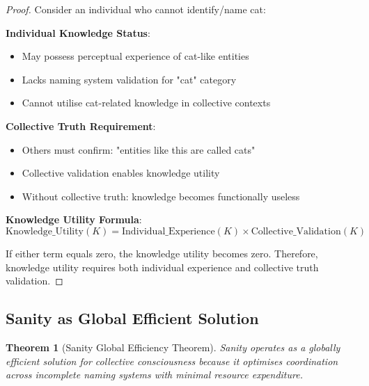 \documentclass[12pt,a4paper]{article}
\newtheorem{theorem}{Theorem}[section]
\begin{document}
\begin{proof}
Consider an individual who cannot identify/name cat:

\textbf{Individual Knowledge Status}:
\begin{itemize}
\item May possess perceptual experience of cat-like entities
\item Lacks naming system validation for "cat" category
\item Cannot utilise cat-related knowledge in collective contexts
\end{itemize}

\textbf{Collective Truth Requirement}:
\begin{itemize}
\item Others must confirm: "entities like this are called cats"
\item Collective validation enables knowledge utility
\item Without collective truth: knowledge becomes functionally useless
\end{itemize}

\textbf{Knowledge Utility Formula}:
\begin{equation}
\text{Knowledge\_Utility}(K) = \text{Individual\_Experience}(K) \times \text{Collective\_Validation}(K)
\end{equation}

If either term equals zero, the knowledge utility becomes zero. Therefore, knowledge utility requires both individual experience and collective truth validation.
\end{proof}

\subsection{Sanity as Global Efficient Solution}

\begin{theorem}[Sanity Global Efficiency Theorem]
Sanity operates as a globally efficient solution for collective consciousness because it optimises coordination across incomplete naming systems with minimal resource expenditure.
\end{theorem}
\end{document}
